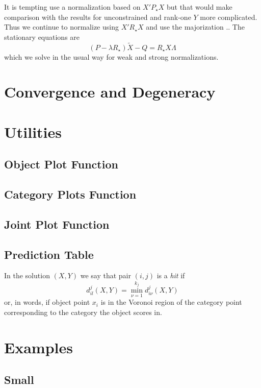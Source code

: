 \documentclass[
  12pt,
]{article}
\begin{document}
It is tempting use a normalization based on \(X'P_\star X\) but that would make comparison with
the results for unconstrained and rank-one \(Y\) more complicated. Thus we continue
to normalize using \(X'R_\star X\) and use the majorization .. The stationary equations are
\[
(P-\lambda R_\star)\tilde X-Q=R_\star X\Lambda
\]
which we solve in the usual way for weak and strong normalizations.

\section{Convergence and Degeneracy}\label{convergence-and-degeneracy}

\section{Utilities}\label{utilities}

\subsection{Object Plot Function}\label{object-plot-function}

\subsection{Category Plots Function}\label{category-plots-function}

\subsection{Joint Plot Function}\label{joint-plot-function}

\subsection{Prediction Table}\label{prediction-table}

In the solution \((X,Y)\) we say that pair \((i,j)\) is a \emph{hit} if
\[
d_{il}^j(X,Y)=\min_{\nu=1}^{k_j}d_{i\nu}^j(X,Y)
\]
or, in words, if object point \(x_i\) is in the Voronoi region of the category point
corresponding to the category the object scores in.

\section{Examples}\label{examples}

\subsection{Small}\label{small}
\end{document}
